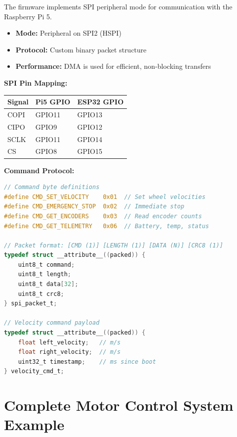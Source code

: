 \documentclass[11pt,letterpaper]{article}
\begin{document}
The firmware implements SPI peripheral mode for communication with the Raspberry Pi 5.

\begin{itemize}
    \item \textbf{Mode:} Peripheral on SPI2 (HSPI)
    \item \textbf{Protocol:} Custom binary packet structure
    \item \textbf{Performance:} DMA is used for efficient, non-blocking transfers
\end{itemize}

\textbf{SPI Pin Mapping:}
\begin{table}[H]
\centering
\begin{tabular}{|l|l|l|}
\hline
\textbf{Signal} & \textbf{Pi5 GPIO} & \textbf{ESP32 GPIO} \\
\hline
COPI & GPIO11 & GPIO13 \\
CIPO & GPIO9 & GPIO12 \\
SCLK & GPIO11 & GPIO14 \\
CS & GPIO8 & GPIO15 \\
\hline
\end{tabular}
\end{table}

\textbf{Command Protocol:}
\begin{lstlisting}[language=C, caption=SPI Command Protocol]
// Command byte definitions
#define CMD_SET_VELOCITY    0x01  // Set wheel velocities
#define CMD_EMERGENCY_STOP  0x02  // Immediate stop
#define CMD_GET_ENCODERS    0x03  // Read encoder counts
#define CMD_GET_TELEMETRY   0x06  // Battery, temp, status

// Packet format: [CMD (1)] [LENGTH (1)] [DATA (N)] [CRC8 (1)]
typedef struct __attribute__((packed)) {
    uint8_t command;
    uint8_t length;
    uint8_t data[32];
    uint8_t crc8;
} spi_packet_t;

// Velocity command payload
typedef struct __attribute__((packed)) {
    float left_velocity;   // m/s
    float right_velocity;  // m/s
    uint32_t timestamp;    // ms since boot
} velocity_cmd_t;
\end{lstlisting}
\section{Complete Motor Control System Example}
\end{document}

